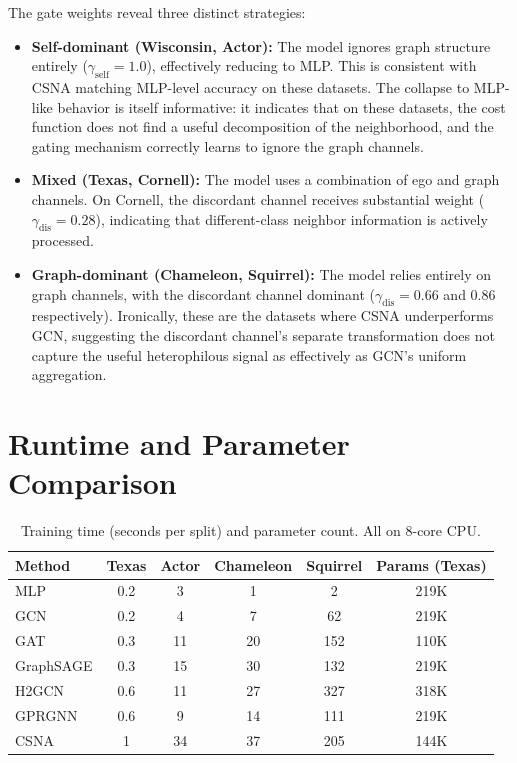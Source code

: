 \documentclass[runningheads]{llncs}
\begin{document}
The gate weights reveal three distinct strategies:
\begin{itemize}
    \item \textbf{Self-dominant (Wisconsin, Actor):} The model ignores graph structure entirely ($\gamma_{\text{self}} = 1.0$), effectively reducing to MLP. This is consistent with CSNA matching MLP-level accuracy on these datasets.
    The collapse to MLP-like behavior is itself informative: it indicates that on these datasets, the cost function does not find a useful decomposition of the neighborhood, and the gating mechanism correctly learns to ignore the graph channels.
    \item \textbf{Mixed (Texas, Cornell):} The model uses a combination of ego and graph channels. On Cornell, the discordant channel receives substantial weight ($\gamma_{\text{dis}} = 0.28$), indicating that different-class neighbor information is actively processed.
    \item \textbf{Graph-dominant (Chameleon, Squirrel):} The model relies entirely on graph channels, with the discordant channel dominant ($\gamma_{\text{dis}} = 0.66$ and $0.86$ respectively). Ironically, these are the datasets where CSNA underperforms GCN, suggesting the discordant channel's separate transformation does not capture the useful heterophilous signal as effectively as GCN's uniform aggregation.
\end{itemize}


\section{Runtime and Parameter Comparison}\label{app:runtime}

\begin{table}[h]
\caption{Training time (seconds per split) and parameter count. All on 8-core CPU.}\label{tab:runtime}
\centering
\small
\begin{tabular}{lcccc|c}
\toprule
Method & Texas & Actor & Chameleon & Squirrel & Params (Texas) \\
\midrule
MLP & 0.2 & 3 & 1 & 2 & 219K \\
GCN & 0.2 & 4 & 7 & 62 & 219K \\
GAT & 0.3 & 11 & 20 & 152 & 110K \\
GraphSAGE & 0.3 & 15 & 30 & 132 & 219K \\
H2GCN & 0.6 & 11 & 27 & 327 & 318K \\
GPRGNN & 0.6 & 9 & 14 & 111 & 219K \\
CSNA & 1 & 34 & 37 & 205 & 144K \\
\bottomrule
\end{tabular}
\end{table}
\end{document}
